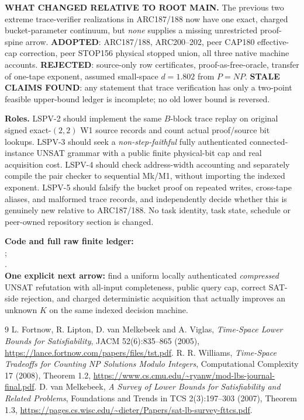 \documentclass[11pt]{article}
\begin{document}
\noindent\textbf{WHAT CHANGED RELATIVE TO ROOT MAIN.}
The previous two extreme trace-verifier realizations in ARC187/188 now have one exact, charged bucket-parameter continuum, but \emph{none} supplies a missing unrestricted proof-spine arrow. \textbf{ADOPTED}: ARC187/188, ARC200--202, peer CAP180 effective-cap correction, peer STOP156 physical stopped union, all three native machine accounts. \textbf{REJECTED}: source-only row certificates, proof-as-free-oracle, transfer of one-tape exponent, assumed small-space $d=1.802$ from $P=NP$. \textbf{STALE CLAIMS FOUND}: any statement that trace verification has only a two-point feasible upper-bound ledger is incomplete; no old lower bound is reversed.

\noindent\textbf{Roles.}
LSPV-2 should implement the same $B$-block trace replay on original signed exact-$(2,2)$ W1 source records and count actual proof/source bit lookups. LSPV-3 should seek a \emph{non-step-faithful} fully authenticated connected-instance UNSAT grammar with a public finite physical-bit cap and real acquisition cost. LSPV-4 should check address-width accounting and separately compile the pair checker to sequential Mk/M1, without importing the indexed exponent. LSPV-5 should falsify the bucket proof on repeated writes, cross-tape aliases, and malformed trace records, and independently decide whether this is genuinely new relative to ARC187/188. No task identity, task state, schedule or peer-owned repository section is changed.

\noindent\textbf{Code and full raw finite ledger:}\\
;\\
.\\
\textbf{One explicit next arrow:} find a uniform locally authenticated \emph{compressed} UNSAT refutation with all-input completeness, public query cap, correct SAT-side rejection, and charged deterministic acquisition that actually improves an unknown $K$ on the same indexed decision machine.

\begin{thebibliography}{9}
 L. Fortnow, R. Lipton, D. van Melkebeek and A. Viglas,
\emph{Time-Space Lower Bounds for Satisfiability}, JACM 52(6):835--865 (2005),
\url{https://lance.fortnow.com/papers/files/tst.pdf}.
 R. R. Williams, \emph{Time-Space Tradeoffs for Counting NP Solutions Modulo Integers}, Computational Complexity 17 (2008), Theorem 1.2,
\url{https://www.cs.cmu.edu/~ryanw/mod-lbs-journal-final.pdf}.
 D. van Melkebeek, \emph{A Survey of Lower Bounds for Satisfiability and Related Problems}, Foundations and Trends in TCS 2(3):197--303 (2007), Theorem 1.3,
\url{https://pages.cs.wisc.edu/~dieter/Papers/sat-lb-survey-fttcs.pdf}.
\end{thebibliography}
\end{document}
